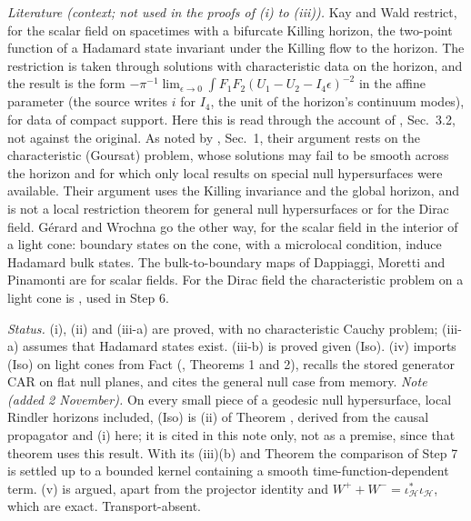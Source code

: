 \emph{Literature (context; not used in the proofs of (i) to (iii)).} Kay and Wald \cite{KayWald1991} restrict, for the scalar field on spacetimes with a bifurcate Killing horizon, the two-point function of a Hadamard state invariant under the Killing flow to the horizon. The restriction is taken through solutions with characteristic data on the horizon, and the result is the form $-\pi^{-1}\lim_{\epsilon\to 0}\int F_{1}F_{2}(U_{1} - U_{2} - I_{4}\epsilon)^{-2}$ in the affine parameter (the source writes $i$ for $I_{4}$, the unit of the horizon's continuum modes), for data of compact support. Here this is read through the account of \cite{DappiaggiMorettiPinamonti2009}, Sec.~3.2, not against the original. As noted by \cite{Sanders2013}, Sec.~1, their argument rests on the characteristic (Goursat) problem, whose solutions may fail to be smooth across the horizon and for which only local results on special null hypersurfaces were available. Their argument uses the Killing invariance and the global horizon, and is not a local restriction theorem for general null hypersurfaces or for the Dirac field. Gérard and Wrochna \cite{GerardWrochna2016} go the other way, for the scalar field in the interior of a light cone: boundary states on the cone, with a microlocal condition, induce Hadamard bulk states. The bulk-to-boundary maps of Dappiaggi, Moretti and Pinamonti are for scalar fields. For the Dirac field the characteristic problem on a light cone is \cite{HafnerNicolas2011}, used in Step 6.

\emph{Status.} (i), (ii) and (iii-a) are proved, with no characteristic Cauchy problem; (iii-a) assumes that Hadamard states exist. (iii-b) is proved given (Iso). (iv) imports (Iso) on light cones from Fact  (\cite{HafnerNicolas2011}, Theorems 1 and 2), recalls the stored generator CAR on flat null planes, and cites the general null case from memory. \emph{Note (added 2 November).} On every small piece of a geodesic null hypersurface, local Rindler horizons included, (Iso) is (ii) of Theorem , derived from the causal propagator and (i) here; it is cited in this note only, not as a premise, since that theorem uses this result. With its (iii)(b) and Theorem  the comparison of Step 7 is settled up to a bounded kernel containing a smooth time-function-dependent term. (v) is argued, apart from the projector identity and $W^{+} + W^{-} = \iota_{\mathcal{H}}^{*}\iota_{\mathcal{H}}$, which are exact. Transport-absent.
